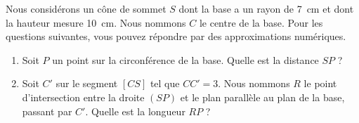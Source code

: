 
\begin{exercice}\label{exo2smath-0182}

    Nous considérons un cône de sommet \( S\) dont la base a un rayon de \SI{7}{\centi\meter} et dont la hauteur mesure \SI{10}{\centi\meter}. Nous nommons \( C\) le centre de la base. Pour les questions suivantes, vous pouvez répondre par des approximations numériques.
    \begin{enumerate}
        \item
            Soit \( P\) un point sur la circonférence de la base. Quelle est la distance \( SP\) ?
        \item
            Soit \( C'\) sur le segment \( [CS]\) tel que \( CC'=3\). Nous nommons \( R\) le point d'intersection entre la droite \( (SP)\) et le plan parallèle au plan de la base, passant par \( C'\). Quelle est la longueur \( RP\) ?
    \end{enumerate}

\end{exercice}
